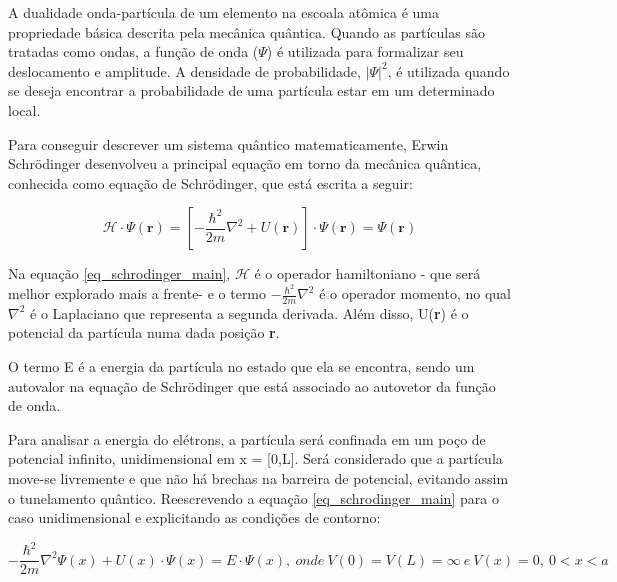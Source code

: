 \par A dualidade onda-partícula de um elemento na escoala atômica é uma propriedade básica descrita pela mecânica quântica\cite{qm_fis3}. Quando as partículas são tratadas como ondas, a função de onda ($\Psi$) é utilizada para formalizar seu deslocamento e amplitude\cite{qm_fis4}. A densidade de probabilidade, $\left| \Psi \right|^2$, é utilizada quando se deseja encontrar a probabilidade de uma partícula estar em um determinado local.

    \par Para conseguir descrever um sistema quântico matematicamente, Erwin Schrödinger desenvolveu a principal equação em torno da mecânica quântica, conhecida como equação de Schrödinger, que está escrita a seguir:

    \begin{equation}\label{eq_schrodinger_main}
      \mathcal{H} \cdot \Psi(\mathbf{r}) = \left[ -\frac{\hbar^2}{2m}\nabla^2 + U(\textbf{r}) \right] \cdot \Psi(\mathbf{r}) = \Psi(\mathbf{r})
    \end{equation}

    \par Na equação \eqref{eq_schrodinger_main}, $\mathcal{H}$ é o operador hamiltoniano - que será melhor explorado mais a frente- e o termo $ -\frac{\hbar^2}{2m}\nabla^2 $ é o operador momento, no qual $\nabla^2$ é o Laplaciano que representa a segunda derivada. Além disso, U(\textbf{r}) é o potencial da partícula numa dada posição \textbf{r}.

    \par O termo E é a energia da partícula no estado que ela se encontra, sendo um autovalor na equação de Schrödinger que está associado ao autovetor da função de onda.

    \par Para analisar a energia do elétrons, a partícula será confinada em um poço de potencial infinito, unidimensional em x = [0,L]. Será considerado que a partícula move-se livremente e que não há brechas na barreira de potencial, evitando assim o tunelamento quântico. Reescrevendo a equação \eqref{eq_schrodinger_main} para o caso unidimensional e explicitando as condições de contorno:

    \begin{equation}\label{eq_schrodinger_frustrado}
      -\frac{\hbar^2}{2m} \nabla^2 \Psi(x) + U(x) \cdot \Psi(x) = E \cdot \Psi(x),
      \ onde\ V(0)=V(L)=\infty\ e\ V(x)=0,\ 0<x<a
    \end{equation}

